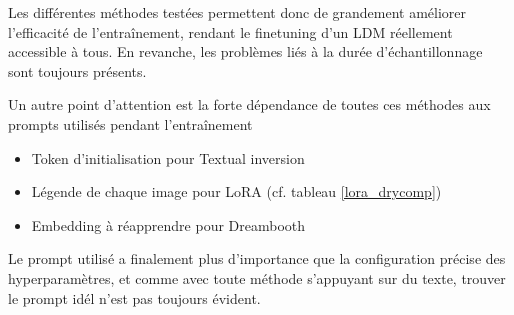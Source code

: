 \documentclass{article}
\begin{document}
Les différentes méthodes testées permettent donc de grandement améliorer l'efficacité de l'entraînement, rendant le finetuning d'un LDM réellement accessible à tous. En revanche, les problèmes liés à la durée d'échantillonnage sont toujours présents. \par
Un autre point d'attention est la forte dépendance de toutes ces méthodes aux prompts utilisés pendant l'entraînement
\begin{itemize}
	\item Token d'initialisation pour Textual inversion
	\item Légende de chaque image pour LoRA (cf. tableau \ref{lora_drycomp})
	\item Embedding à réapprendre pour Dreambooth
\end{itemize}
Le prompt utilisé a finalement plus d'importance que la configuration précise des hyperparamètres, et comme avec toute méthode s'appuyant sur du texte, trouver le prompt idél n'est pas toujours évident.

\clearpage
\printbibliography[heading=bibintoc]
\end{document}
